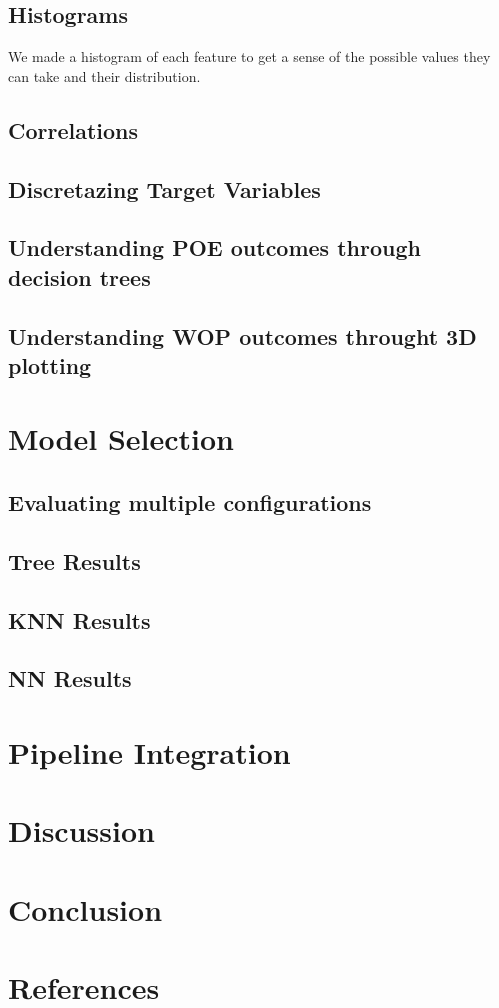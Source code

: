\documentclass[12pt,letterpaper]{article}
\begin{document}
\subsection{Histograms}
We made a histogram of each feature to get a sense of the possible values they can take and their distribution.
\subsection{Correlations}
\subsection{Discretazing Target Variables}
\subsection{Understanding POE outcomes through decision trees}
\subsection{Understanding WOP outcomes throught 3D plotting}




\section{Model Selection}
\subsection{Evaluating multiple configurations}
\subsection{Tree Results}
\subsection{KNN Results}
\subsection{NN Results}
\section{Pipeline Integration}
\section{Discussion}
\section{Conclusion}
\section{References}
\end{document}
